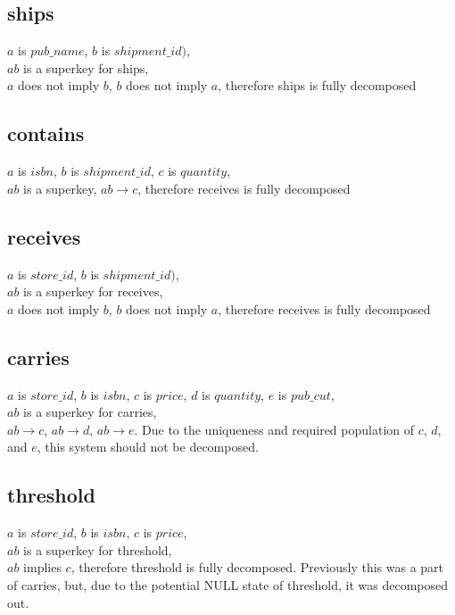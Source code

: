 \documentclass[titlepage, oneside]{article}
\begin{document}
        \subsection{ships}
            $a$ is $pub\_name$, $b$ is $shipment\_id)$, \\
            $ab$ is a superkey for ships, \\
            $a$ does not imply $b$, $b$ does not imply $a$, therefore ships is fully decomposed
        \subsection{contains}
            $a$ is $isbn$, $b$ is $shipment\_id$, $c$ is $quantity$, \\
            $ab$ is a superkey,
            $ab \rightarrow c$, therefore receives is fully decomposed
        \subsection{receives}
            $a$ is $store\_id$, $b$ is $shipment\_id)$, \\
            $ab$ is a superkey for receives, \\
            $a$ does not imply $b$, $b$ does not imply $a$, therefore receives is fully decomposed
        \subsection{carries}
            $a$ is $store\_id$, $b$ is $isbn$, $c$ is $price$, $d$ is $quantity$, $e$ is $pub\_cut$, \\
            $ab$ is a superkey for carries, \\
            $ab \rightarrow c$, $ab \rightarrow d$, $ab \rightarrow e$. Due to the uniqueness and required population of $c$, $d$, and $e$, this system should not be decomposed.
        \subsection{threshold}
            $a$ is $store\_id$, $b$ is $isbn$, $c$ is $price$, \\
            $ab$ is a superkey for threshold, \\
            $ab$ implies $c$, therefore threshold is fully decomposed. Previously this was a part of carries, but, due to the potential NULL state of threshold, it was decomposed out.
\end{document}
